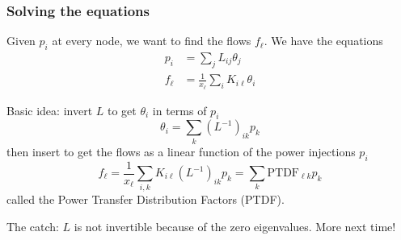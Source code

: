 \documentclass[10pt,aspectratio=169,dvipsnames]{beamer}
\begin{document}
\begin{frame}
  \frametitle{Solving the equations}

  Given $p_i$ at every node, we want to find the flows $f_\ell$. We
  have the equations
    \begin{align*}
      p_i & = \sum_{j} L_{ij} \theta_j \\
     f_\ell  & = \frac{1}{x_\ell}\sum_{i} K_{i\ell} \theta_i
    \end{align*}

    Basic idea: invert $L$ to get $\theta_i$ in terms of $p_i$
    \begin{equation*}
      \theta_i  = \sum_{k} (L^{-1})_{ik} p_k
    \end{equation*}
    then insert to get the flows as a linear function of the power injections $p_i$
    \begin{equation*}
    f_\ell   = \frac{1}{x_\ell}\sum_{i,k} K_{i\ell}  (L^{-1})_{ik} p_k = \sum_k \textrm{PTDF}_{\ell k} p_k
    \end{equation*}
    called the \alert{Power Transfer Distribution Factors} (PTDF).

    The catch: $L$ is not invertible because of the zero eigenvalues. More next time!
\end{frame}
\end{document}
